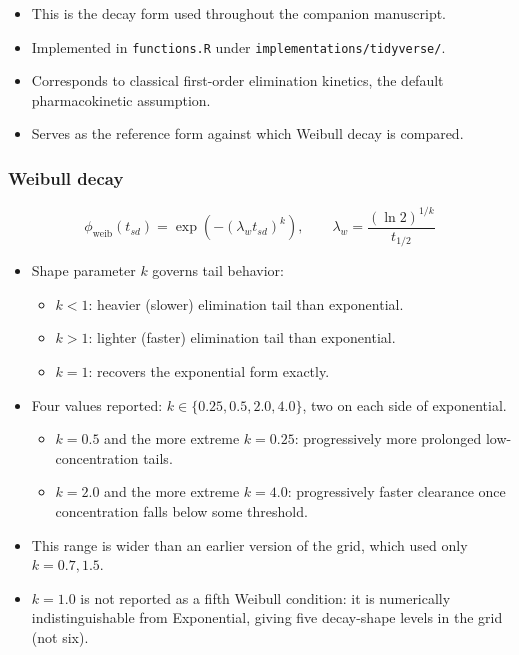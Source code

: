 \documentclass[
  11pt,
]{article}
\providecommand{\tightlist}{%
  \setlength{\itemsep}{0pt}\setlength{\parskip}{0pt}}
\begin{document}
\begin{itemize}
\tightlist
\item
  This is the decay form used throughout the companion manuscript.
\item
  Implemented in \texttt{functions.R} under \texttt{implementations/tidyverse/}.
\item
  Corresponds to classical first-order elimination kinetics, the
  default pharmacokinetic assumption.
\item
  Serves as the reference form against which Weibull decay is
  compared.
\end{itemize}

\subsubsection{Weibull decay}\label{weibull-decay}

\[
\phi_{\text{weib}}(t_{sd}) =
  \exp\left(-\left(\lambda_w t_{sd}\right)^{k}\right), \qquad
  \lambda_w = \frac{(\ln 2)^{1/k}}{t_{1/2}}
\]

\begin{itemize}
\tightlist
\item
  Shape parameter \(k\) governs tail behavior:

  \begin{itemize}
  \tightlist
  \item
    \(k < 1\): heavier (slower) elimination tail than exponential.
  \item
    \(k > 1\): lighter (faster) elimination tail than exponential.
  \item
    \(k = 1\): recovers the exponential form exactly.
  \end{itemize}
\item
  Four values reported: \(k \in \{0.25, 0.5, 2.0, 4.0\}\), two on each
  side of exponential.

  \begin{itemize}
  \tightlist
  \item
    \(k = 0.5\) and the more extreme \(k = 0.25\): progressively more
    prolonged low-concentration tails.
  \item
    \(k = 2.0\) and the more extreme \(k = 4.0\): progressively faster
    clearance once concentration falls below some threshold.
  \end{itemize}
\item
  This range is wider than an earlier version of the grid, which
  used only \(k = 0.7, 1.5\).
\item
  \(k = 1.0\) is not reported as a fifth Weibull condition: it is
  numerically indistinguishable from Exponential, giving five
  decay-shape levels in the grid (not six).
\end{itemize}
\end{document}
